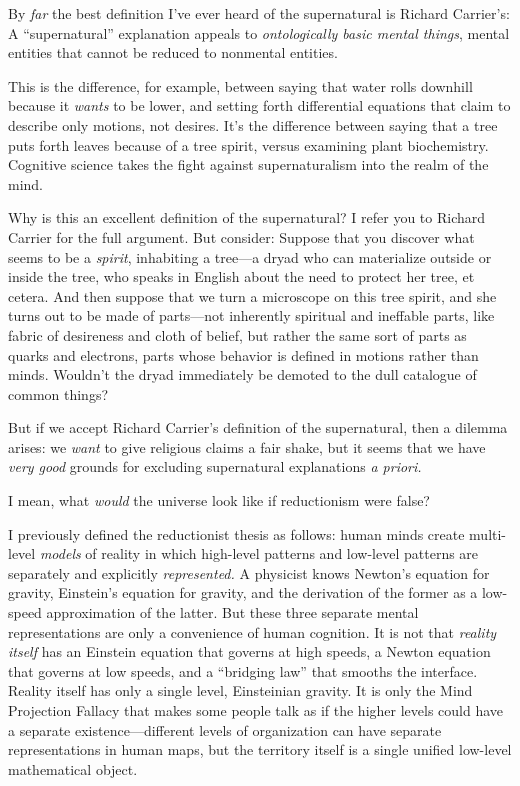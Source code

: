 {
 By \textit{far} the best definition I've ever
heard of the supernatural is Richard Carrier's: A
``supernatural'' explanation appeals
to \textit{ontologically basic mental things}, mental entities that
cannot be reduced to nonmental entities.}

{
 This is the difference, for example, between saying that water
rolls downhill because it \textit{wants} to be lower, and setting forth
differential equations that claim to describe only motions, not
desires. It's the difference between saying that a tree
puts forth leaves because of a tree spirit, versus examining plant
biochemistry. Cognitive science takes the fight against supernaturalism
into the realm of the mind.}

{
 Why is this an excellent definition of the supernatural? I refer
you to Richard Carrier for the full argument. But consider: Suppose
that you discover what seems to be a \textit{spirit}, inhabiting a
tree---a dryad who can materialize outside or inside the tree, who
speaks in English about the need to protect her tree, et cetera. And
then suppose that we turn a microscope on this tree spirit, and she
turns out to be made of parts---not inherently spiritual and ineffable
parts, like fabric of desireness and cloth of belief, but rather the
same sort of parts as quarks and electrons, parts whose behavior is
defined in motions rather than minds. Wouldn't the
dryad immediately be demoted to the dull catalogue of common things?}

{
 But if we accept Richard Carrier's definition of
the supernatural, then a dilemma arises: we \textit{want} to give
religious claims a fair shake, but it seems that we have \textit{very
good} grounds for excluding supernatural explanations \textit{a
priori.}}

{
 I mean, what \textit{would} the universe look like if reductionism
were false?}

{
 I previously defined the reductionist thesis as follows: human
minds create multi-level \textit{models} of reality in which high-level
patterns and low-level patterns are separately and explicitly
\textit{represented.} A physicist knows Newton's
equation for gravity, Einstein's equation for gravity,
and the derivation of the former as a low-speed approximation of the
latter. But these three separate mental representations are only a
convenience of human cognition. It is not that \textit{reality itself}
has an Einstein equation that governs at high speeds, a Newton equation
that governs at low speeds, and a ``bridging
law'' that smooths the interface. Reality itself has
only a single level, Einsteinian gravity. It is only the Mind
Projection Fallacy that makes some people talk as if the higher levels
could have a separate existence---different levels of organization can
have separate representations in human maps, but the territory itself
is a single unified low-level mathematical object.}

